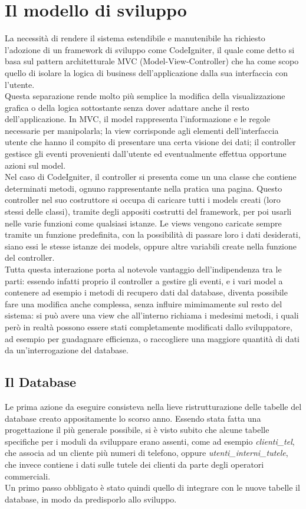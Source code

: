 \section{Il modello di sviluppo}
La necessit\`a di rendere il sistema estendibile e manutenibile ha richiesto l'adozione di un framework di sviluppo come CodeIgniter, il quale come detto si basa sul pattern architetturale MVC (Model-View-Controller) che ha come scopo quello di isolare la logica di business dell'applicazione dalla sua interfaccia con l'utente.\\
Questa separazione rende molto pi\`u semplice la modifica della visualizzazione grafica o della logica sottostante senza dover adattare anche il resto dell'applicazione. In MVC, il model rappresenta l'informazione e le regole necessarie per manipolarla; la view corrisponde agli elementi dell'interfaccia utente che hanno il compito di presentare una certa visione dei dati; il controller gestisce gli eventi provenienti dall'utente ed eventualmente effettua opportune azioni sul model. \\
Nel caso di CodeIgniter, il controller si presenta come un una classe che contiene determinati metodi, ognuno rappresentante nella pratica una pagina. Questo controller nel suo costruttore si occupa di caricare tutti i models creati (loro stessi delle classi), tramite degli appositi costrutti del framework, per poi usarli nelle varie funzioni come qualsiasi istanze. Le views vengono caricate sempre tramite un funzione predefinita, con la possibilit\`a di passare loro i dati desiderati, siano essi le stesse istanze dei models, oppure altre variabili create nella funzione del controller.  \\
Tutta questa interazione porta al notevole vantaggio dell'indipendenza tra le parti: essendo infatti proprio il controller a gestire gli eventi, e i vari model a contenere ad esempio i metodi di recupero dati dal database, diventa possibile fare una modifica anche complessa, senza influire mimimamente sul resto del sistema: si pu\`o avere una view che all'interno richiama i medesimi metodi, i quali per\`o in realt\`a possono essere stati completamente modificati dallo sviluppatore, ad esempio per guadagnare efficienza, o raccogliere una maggiore quantit\`a di dati da un'interrogazione del database.

\newpage
\subsection{Il Database}
Le prima azione da eseguire consisteva nella lieve ristrutturazione delle tabelle del database creato appositamente lo scorso anno. Essendo stata fatta una progettazione il pi\`u generale possibile, si \`e visto subito che alcune tabelle specifiche per i moduli da sviluppare erano assenti, come ad esempio \textit{clienti\_tel}, che associa ad un cliente pi\`u numeri di telefono, oppure \textit{utenti\_interni\_tutele}, che invece contiene i dati sulle tutele dei clienti da parte degli operatori commerciali. \\
Un primo passo obbligato \`e stato quindi quello di integrare con le nuove tabelle il database, in modo da predisporlo allo sviluppo.

